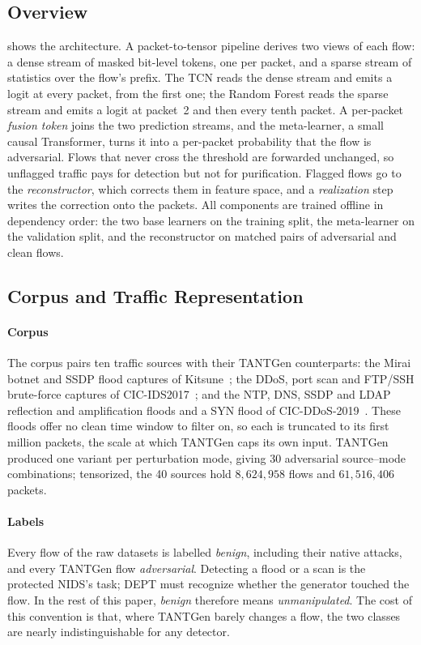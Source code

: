 \documentclass[acmtog,nonacm,pbalance]{acmart}
\begin{document}
\subsection{Overview}

 shows the architecture. A packet-to-tensor pipeline derives two
views of each flow: a dense stream of masked bit-level tokens, one per packet,
and a sparse stream of statistics over the flow's prefix. The TCN reads the
dense stream and emits a logit at every packet, from the first one; the Random
Forest reads the sparse stream and emits a logit at packet~2 and then every
tenth packet. A per-packet \emph{fusion token} joins the two prediction streams,
and the meta-learner, a small causal Transformer, turns it into a per-packet
probability that the flow is adversarial. Flows that never cross the threshold
are forwarded unchanged, so unflagged traffic pays for detection but not for
purification. Flagged flows go to the \emph{reconstructor}, which corrects them
in feature space, and a \emph{realization} step writes the correction onto the
packets. All components are trained offline in dependency order: the two base
learners on the training split, the meta-learner on the validation split, and
the reconstructor on matched pairs of adversarial and clean flows.

\subsection{Corpus and Traffic Representation}\label{sec:corpus}

\paragraph{Corpus} The corpus pairs ten traffic sources with their TANTGen
counterparts: the Mirai botnet and SSDP flood captures of
Kitsune~\cite{mirsky2018kitsune}; the DDoS, port scan and FTP/SSH brute-force
captures of CIC-IDS2017~\cite{sharafaldin2018cicids}; and the NTP, DNS, SSDP and LDAP
reflection and amplification floods and a SYN flood of
CIC-DDoS-2019~\cite{sharafaldin2019cicddos}. These floods offer no clean time
window to filter on, so each is truncated to its first million packets, the
scale at which TANTGen caps its own input. TANTGen produced one variant per perturbation mode, giving 30 adversarial source--mode
combinations; tensorized, the 40 sources hold $8{,}624{,}958$ flows and
$61{,}516{,}406$ packets.

\paragraph{Labels} Every flow of the raw datasets is labelled \emph{benign},
including their native attacks, and every TANTGen flow \emph{adversarial}.
Detecting a flood or a scan is the protected NIDS's task; DEPT must recognize
whether the generator touched the flow. In the rest of this paper,
\emph{benign} therefore means \emph{unmanipulated}. The cost of this convention
is that, where TANTGen barely changes a flow, the two classes are nearly
indistinguishable for any detector.
\end{document}
